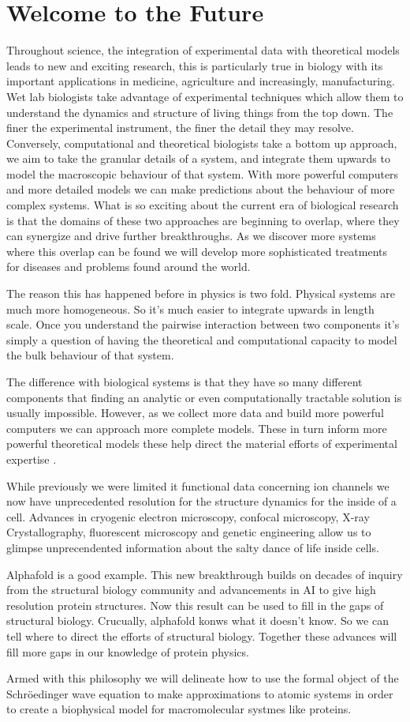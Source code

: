\section{Welcome to the Future}
Throughout science, the integration of experimental data with theoretical models leads to new and exciting research, this is particularly true in biology with its important applications in medicine, agriculture and increasingly, manufacturing. Wet lab biologists take advantage of experimental techniques which allow them to understand the dynamics and structure of living things from the top down. The finer the experimental instrument, the finer the detail they may resolve. Conversely, computational and theoretical biologists take a bottom up approach, we aim to take the granular details of a system, and integrate them upwards to model the macroscopic behaviour of that system. With more powerful computers and more detailed models we can make predictions about the behaviour of more complex systems. What is so exciting about the current era of biological research is that the domains of these two approaches are beginning to overlap, where they can synergize  and drive further breakthroughs. As we discover more systems where this overlap can be found we will develop more sophisticated treatments for diseases and problems found around the world.

The reason this has happened before in physics is two fold. Physical systems are much more homogeneous. So it's much easier to integrate upwards in length scale. Once you understand the pairwise interaction between two components it's simply a question of having the theoretical and computational capacity to model the bulk behaviour of that system. 

The difference with biological systems is that they have so many different components that finding an analytic or even computationally tractable solution is usually impossible. However, as we collect more data and build more powerful computers we can approach more complete models. These in turn inform more powerful theoretical models these help direct the material efforts of experimental expertise . 

While previously we were limited it functional data concerning ion channels we now have unprecedented resolution for the structure dynamics for the inside of a cell. Advances in cryogenic electron microscopy, confocal microscopy, X-ray Crystallography, fluorescent microscopy and genetic engineering allow us to glimpse unprecendented information about the salty dance of life inside cells.

Alphafold is a good example. This new breakthrough builds on decades of inquiry from the structural biology community and advancements in AI to give high resolution protein structures. Now this result can be used to fill in the gaps of structural biology. Crucually, alphafold konws what it doesn't know. So we can tell where to direct the efforts of structural biology. Together these advances will fill more gaps in our knowledge of protein physics. 

Armed with this philosophy we will delineate how to use the formal object of the Schr\"oedinger wave equation to make approximations to atomic systems in order to create a biophysical model for macromolecular systmes like proteins.
